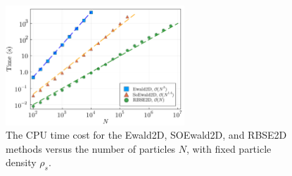 \begin{figure}[ht]
	\centering
	\includegraphics[width=0.6\textwidth]{figs/times_compare.pdf} 
	\caption{
		The CPU time cost for the Ewald2D, SOEwald2D, and RBSE2D methods versus the number of particles $N$, with fixed particle density $\rho_s$. 
	}
	\label{fig:times_compare}
\end{figure}